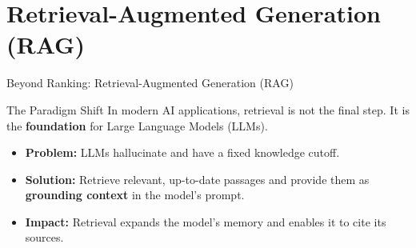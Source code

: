 \documentclass[aspectratio=169]{beamer}
\newif\ifanimated
\newcommand{\cpause}{\ifanimated\pause\fi}
\begin{document}
\section{Retrieval-Augmented Generation (RAG)}

\begin{frame}[plain]
\sectionpage
\end{frame}

\begin{frame}{Beyond Ranking: Retrieval-Augmented Generation (RAG)}
\begin{block}{The Paradigm Shift}
In modern AI applications, retrieval is not the final step. It is the \textbf{foundation} for Large Language Models (LLMs).
\end{block}

\vspace{1em}
\cpause

\begin{itemize}
    \item \textbf{Problem:} LLMs hallucinate and have a fixed knowledge cutoff.
    \item \textbf{Solution:} Retrieve relevant, up-to-date passages and provide them as \textbf{grounding context} in the model's prompt.
    \item \textbf{Impact:} Retrieval expands the model's memory and enables it to cite its sources.
\end{itemize}
\end{frame}
\end{document}

